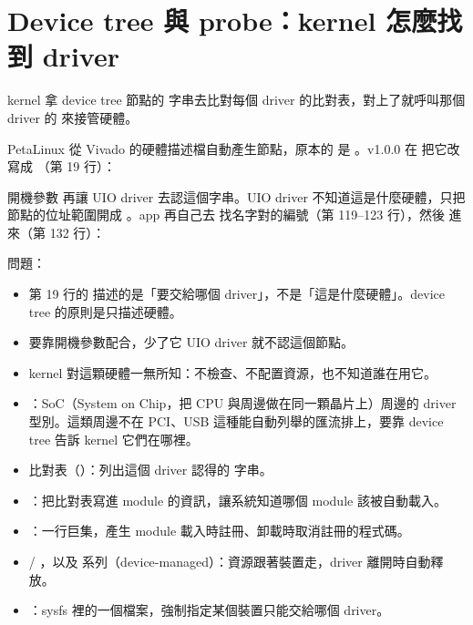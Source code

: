 \clearpage
\section{Device tree 與 probe：kernel 怎麼找到 driver}
\label{sec:dt}

\begin{oneline}
kernel 拿 device tree 節點的  字串去比對每個 driver 的比對表，對上了就呼叫那個 driver 的  來接管硬體。
\end{oneline}

\begin{before}
PetaLinux 從 Vivado 的硬體描述檔自動產生節點，原本的  是 。v1.0.0 在  把它改寫成 （第 19 行）：


開機參數  再讓 UIO driver 去認這個字串。UIO driver 不知道這是什麼硬體，只把節點的位址範圍開成 。app 再自己去  找名字對的編號（第 119–123 行），然後  進來（第 132 行）：


問題：
\begin{itemize}
\item 第 19 行的  描述的是「要交給哪個 driver」，不是「這是什麼硬體」。device tree 的原則是只描述硬體。
\item 要靠開機參數配合，少了它 UIO driver 就不認這個節點。
\item kernel 對這顆硬體一無所知：不檢查、不配置資源，也不知道誰在用它。
\end{itemize}
\end{before}

\begin{tech}
\begin{itemize}
\item {}：SoC（System on Chip，把 CPU 與周邊做在同一顆晶片上）周邊的 driver 型別。這類周邊不在 PCI、USB 這種能自動列舉的匯流排上，要靠 device tree 告訴 kernel 它們在哪裡。
\item {} 比對表（）：列出這個 driver 認得的  字串。
\item {}：把比對表寫進 module 的資訊，讓系統知道哪個 module 該被自動載入。
\item {}：一行巨集，產生 module 載入時註冊、卸載時取消註冊的程式碼。
\item {} / ，以及  系列（device-managed）：資源跟著裝置走，driver 離開時自動釋放。
\item {}：sysfs 裡的一個檔案，強制指定某個裝置只能交給哪個 driver。
\end{itemize}
\end{tech}

